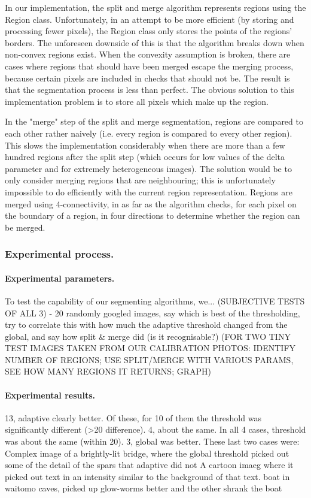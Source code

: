 In our implementation, the split and merge algorithm represents regions using the Region class. Unfortunately, in an attempt to be more efficient (by storing and processing fewer pixels), the Region class only stores the points of the regions' borders. The unforeseen downside of this is that the algorithm breaks down when non-convex regions exist. When the convexity assumption is broken, there are cases where regions that should have been merged escape the merging process, because certain pixels are included in checks that should not be. The result is that the segmentation process is less than perfect. The obvious solution to this implementation problem is to store all pixels which make up the region.

In the "merge" step of the split and merge segmentation, regions are compared to each other rather naively (i.e. every region is compared to every other region). This slows the implementation considerably when there are more than a few hundred regions after the split step (which occurs for low values of the delta parameter and for extremely heterogeneous images). The solution would be to only consider merging regions that are neighbouring; this is unfortunately impossible to do efficiently with the current region representation. Regions are merged using 4-connectivity, in as far as the algorithm checks, for each pixel on the boundary of a region, in four directions to determine whether the region can be merged.

\subsubsection{Experimental process.}

\paragraph{Experimental parameters.}
To test the capability of our segmenting algorithms, we...
(SUBJECTIVE TESTS OF ALL 3) - 20 randomly googled images, say which is best of the thresholding, try to correlate this with how much the adaptive threshold changed from the global, and say how split \& merge did (is it recognisable?)
(FOR TWO TINY TEST IMAGES TAKEN FROM OUR CALIBRATION PHOTOS: IDENTIFY NUMBER OF REGIONS; USE SPLIT/MERGE WITH VARIOUS PARAMS, SEE HOW MANY REGIONS IT RETURNS; GRAPH)

\paragraph{Experimental results.}
13, adaptive clearly better. Of these, for 10 of them the threshold was significantly different (>20 difference). 4, about the same. In all 4 cases, threshold was about the same (within 20). 3, global was better. These last two cases were:
 Complex image of a brightly-lit bridge, where the global threshold picked out some of the detail of the spars that adaptive did not
A cartoon imaeg where it picked out text in an intensity similar to the background of that text.
boat in waitomo caves, picked up glow-worms better and the other shrank the boat






